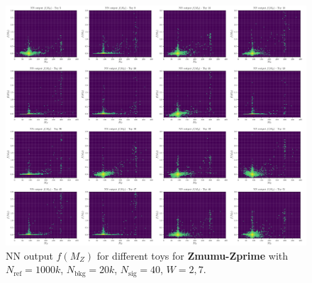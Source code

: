\begin{figure}[H]
	\centering
	\includegraphics[width=1.0\textwidth]{Python/RESULTS/INV_MASS/f_plot.pdf}
	\caption{NN output $f(M_{Z})$ for different toys for \textbf{Zmumu-Zprime} with $N_\mathrm{ref}=1000\si{k}$, $N_\mathrm{bkg}=20\si{k}$, $N_\mathrm{sig}=40$, $W=2,7$.}
	\label{fig:F_PLOT}
\end{figure}


